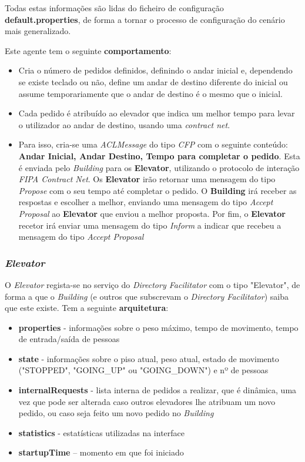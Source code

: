 ﻿\documentclass[a4paper]{article}
\begin{document}
Todas estas informações são lidas do ficheiro de configuração \textbf{default.properties}, de forma a tornar o processo de configuração do cenário mais generalizado.

Este agente tem o seguinte \textbf{comportamento}:

\begin{itemize}
\item Cria o número de pedidos definidos, definindo o andar inicial e, dependendo se existe teclado ou não, define um andar de destino diferente do inicial ou assume temporariamente que o andar de destino é o mesmo que o inicial. 
\item Cada pedido é atribuído ao elevador que indica um melhor tempo para levar o utilizador ao andar de destino, usando uma \textit{contract net}. 
\item Para isso, cria-se uma \textit{ACLMessage} do tipo \textit{CFP} com o seguinte conteúdo: \textbf{Andar Inicial, Andar Destino, Tempo para completar o pedido}. Esta é enviada pelo \textit{Building} para os \textbf{Elevator}, utilizando o protocolo de interação \textit{FIPA Contract Net}. Os \textbf{Elevator} irão retornar uma mensagem do tipo \textit{Propose} com o seu tempo até completar o pedido. O \textbf{Building} irá receber as respostas e escolher a melhor, enviando uma mensagem do tipo \textit{Accept Proposal} ao \textbf{Elevator} que enviou a melhor proposta. Por fim, o \textbf{Elevator} recetor irá enviar uma mensagem do tipo \textit{Inform} a indicar que recebeu a mensagem do tipo \textit{Accept Proposal}\end{itemize}

\subsubsection {\textit{Elevator}}

O \textit{Elevator} regista-se no serviço do \textit{Directory Facilitator} com o tipo "Elevator", de forma a que o \textit{Building} (e outros que subscrevam o \textit{Directory Facilitator}) saiba que este existe. Tem a seguinte \textbf{arquitetura}:

\begin{itemize}
\item \textbf{properties} -  informações sobre o peso máximo, tempo de movimento, tempo de entrada/saída de pessoas
\item \textbf{state} - informações sobre o piso atual, peso atual, estado de movimento ("STOPPED", "GOING\_UP" ou "GOING\_DOWN") e nº de pessoas
\item \textbf{internalRequests} - lista interna de pedidos a realizar, que é dinâmica, uma vez que pode ser alterada caso outros elevadores lhe atribuam um novo pedido, ou caso seja feito um novo pedido no \textit{Building}
\item \textbf{statistics} - estatísticas utilizadas na interface
\item \textbf{startupTime} – momento em que foi iniciado
\end{itemize}
\end{document}
